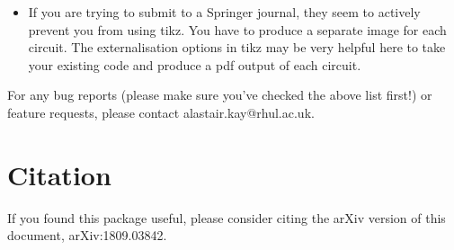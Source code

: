 \documentclass[aps,pra,10pt,nofootinbib]{revtex4-2}
\begin{document}
\begin{itemize}
  \item If you are trying to submit to a Springer journal, they seem to actively prevent you from using tikz. You have to produce a separate image for each circuit. The externalisation options in tikz may be very helpful here to take your existing code and produce a pdf output of each circuit.
\end{itemize}

For any bug reports (please make sure you've checked the above list first!) or feature requests, please contact alastair.kay@rhul.ac.uk.

\section{Citation}

If you found this package useful, please consider citing the arXiv version of this document, arXiv:1809.03842.
\end{document}
